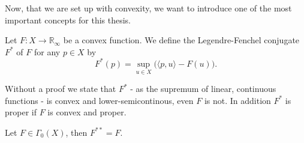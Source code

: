     Now, that we are set up with convexity, we want to introduce one of the most important concepts for this thesis.

    \begin{definition} %
    \label{def:legendre_fenchel_conjugate}

        Let $F: X \longrightarrow \mathbb{R}_{\infty}$ be a convex function. We define the Legendre-Fenchel conjugate $F^{\ast}$ of $F$ for any $p \in X$ by
            \begin{equation}
                F^{\ast}(p) = \sup_{u \in X} \big( \langle p, u \rangle - F(u) \big).
                \label{eq:legendre_fenchel_conjugate}
            \end{equation}

    \end{definition}

    \begin{remark} %
        Without a proof we state that $F^{\ast}$ - as the supremum of linear, continuous functions - is convex and lower-semicontinous, even $F$ is not. In addition $F^{\ast}$ is proper if $F$ is convex and proper.
    \end{remark}

    \begin{theorem} %
        Let $F \in \Gamma_{0}(X)$, then $F^{\ast\ast} = F$.
    \end{theorem}

